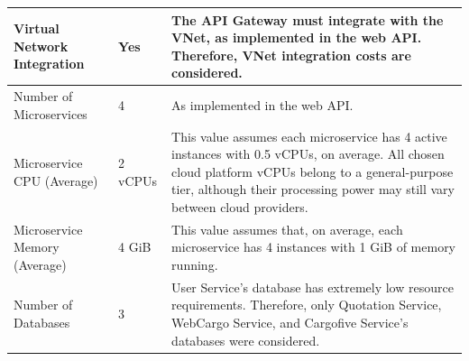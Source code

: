 \documentclass[12pt, reqno]{amsbook}
\theoremstyle{definition}
\theoremstyle{definition}
\numberwithin{section}{chapter}
\numberwithin{table}{chapter}
\numberwithin{figure}{chapter}
\begin{document}
\begin{longtable}{|M{70pt}|M{55pt}|m{300pt}|}
  \hline
  Virtual Network Integration
   & Yes
   & The \ac{API} Gateway must integrate with the \ac{VNet}, as implemented in the web \ac{API}. Therefore, \ac{VNet} integration costs are considered.                                                                                                                                                                                                                                                                                                                                  \\
  \hline
  Number of Microservices
   & 4
   & As implemented in the web \ac{API}.                                                                                                                                                                                                                                                                                                                                                                                                                                                 \\
  \hline
  Microservice CPU (Average)
   & 2 vCPUs
   & This value assumes each microservice has 4 active instances with 0.5 \acp{vCPU}, on average. All chosen cloud platform \acp{vCPU} belong to a general-purpose tier, although their processing power may still vary between cloud providers.                                                                                                                                                                                                                                         \\
  \hline
  Microservice Memory (Average)
   & 4 GiB
   & This value assumes that, on average, each microservice has 4 instances with 1 \ac{GiB} of memory running.                                                                                                                                                                                                                                                                                                                                                                           \\
  \hline
  Number of Databases
   & 3
   & User Service's database has extremely low resource requirements. Therefore, only Quotation Service, WebCargo Service, and Cargofive Service's databases were considered.                                                                                                                                                                                                                                                                                                            \\

\end{longtable}
\end{document}
